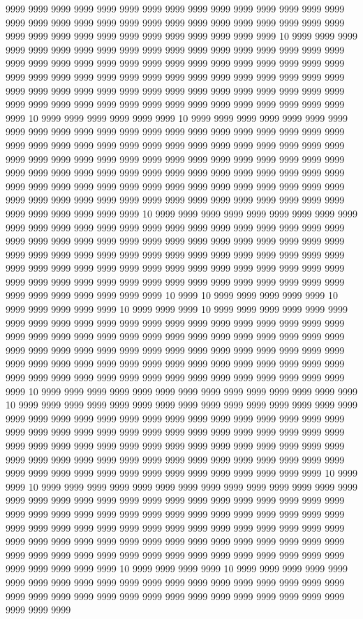 9999 9999 9999 9999 9999 9999 9999 9999 9999 9999 9999 9999 9999 9999 9999 9999 9999 9999 9999 9999 9999 9999 9999 9999 9999 9999 9999 9999 9999 9999 9999 9999 9999 9999 9999 9999 9999 9999 9999 9999 9999 9999 10 9999 9999 9999 9999 9999 9999 9999 9999 9999 9999 9999 9999 9999 9999 9999 9999 9999 9999 9999 9999 9999 9999 9999 9999 9999 9999 9999 9999 9999 9999 9999 9999 9999 9999 9999 9999 9999 9999 9999 9999 9999 9999 9999 9999 9999 9999 9999 9999 9999 9999 9999 9999 9999 9999 9999 9999 9999 9999 9999 9999 9999 9999 9999 9999 9999 9999 9999 9999 9999 9999 9999 9999 9999 9999 9999 9999 9999 9999 9999 10 9999 9999 9999 9999 9999 9999 10 9999 9999 9999 9999 9999 9999 9999 9999 9999 9999 9999 9999 9999 9999 9999 9999 9999 9999 9999 9999 9999 9999 9999 9999 9999 9999 9999 9999 9999 9999 9999 9999 9999 9999 9999 9999 9999 9999 9999 9999 9999 9999 9999 9999 9999 9999 9999 9999 9999 9999 9999 9999 9999 9999 9999 9999 9999 9999 9999 9999 9999 9999 9999 9999 9999 9999 9999 9999 9999 9999 9999 9999 9999 9999 9999 9999 9999 9999 9999 9999 9999 9999 9999 9999 9999 9999 9999 9999 9999 9999 9999 9999 9999 9999 9999 9999 9999 9999 9999 9999 9999 9999 9999 10 9999 9999 9999 9999 9999 9999 9999 9999 9999 9999 9999 9999 9999 9999 9999 9999 9999 9999 9999 9999 9999 9999 9999 9999 9999 9999 9999 9999 9999 9999 9999 9999 9999 9999 9999 9999 9999 9999 9999 9999 9999 9999 9999 9999 9999 9999 9999 9999 9999 9999 9999 9999 9999 9999 9999 9999 9999 9999 9999 9999 9999 9999 9999 9999 9999 9999 9999 9999 9999 9999 9999 9999 9999 9999 9999 9999 9999 9999 9999 9999 9999 9999 9999 9999 9999 9999 9999 9999 9999 9999 9999 10 9999 10 9999 9999 9999 9999 9999 10 9999 9999 9999 9999 9999 10 9999 9999 9999 10 9999 9999 9999 9999 9999 9999 9999 9999 9999 9999 9999 9999 9999 9999 9999 9999 9999 9999 9999 9999 9999 9999 9999 9999 9999 9999 9999 9999 9999 9999 9999 9999 9999 9999 9999 9999 9999 9999 9999 9999 9999 9999 9999 9999 9999 9999 9999 9999 9999 9999 9999 9999 9999 9999 9999 9999 9999 9999 9999 9999 9999 9999 9999 9999 9999 9999 9999 9999 9999 9999 9999 9999 9999 9999 9999 9999 9999 9999 9999 9999 9999 9999 10 9999 9999 9999 9999 9999 9999 9999 9999 9999 9999 9999 9999 9999 9999 10 9999 9999 9999 9999 9999 9999 9999 9999 9999 9999 9999 9999 9999 9999 9999 9999 9999 9999 9999 9999 9999 9999 9999 9999 9999 9999 9999 9999 9999 9999 9999 9999 9999 9999 9999 9999 9999 9999 9999 9999 9999 9999 9999 9999 9999 9999 9999 9999 9999 9999 9999 9999 9999 9999 9999 9999 9999 9999 9999 9999 9999 9999 9999 9999 9999 9999 9999 9999 9999 9999 9999 9999 9999 9999 9999 9999 9999 9999 9999 9999 9999 9999 9999 9999 9999 9999 9999 9999 9999 10 9999 9999 10 9999 9999 9999 9999 9999 9999 9999 9999 9999 9999 9999 9999 9999 9999 9999 9999 9999 9999 9999 9999 9999 9999 9999 9999 9999 9999 9999 9999 9999 9999 9999 9999 9999 9999 9999 9999 9999 9999 9999 9999 9999 9999 9999 9999 9999 9999 9999 9999 9999 9999 9999 9999 9999 9999 9999 9999 9999 9999 9999 9999 9999 9999 9999 9999 9999 9999 9999 9999 9999 9999 9999 9999 9999 9999 9999 9999 9999 9999 9999 9999 9999 9999 9999 9999 9999 9999 9999 9999 9999 9999 9999 9999 9999 9999 10 9999 9999 9999 9999 10 9999 9999 9999 9999 9999 9999 9999 9999 9999 9999 9999 9999 9999 9999 9999 9999 9999 9999 9999 9999 9999 9999 9999 9999 9999 9999 9999 9999 9999 9999 9999 9999 9999 9999 9999 9999 9999 9999 